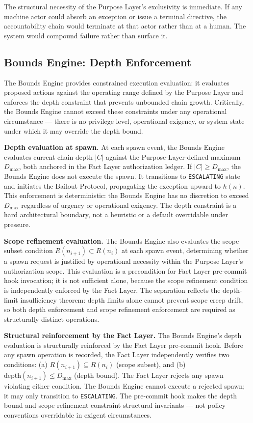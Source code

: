 \medskip
The structural necessity of the Purpose Layer's exclusivity is immediate. If any machine actor could absorb an exception or issue a terminal directive, the accountability chain would terminate at that actor rather than at a human. The system would compound failure rather than surface it.

\subsection{Bounds Engine: Depth Enforcement}
\label{sec:rs-bounds-depth}

The Bounds Engine provides constrained execution evaluation: it evaluates proposed actions against the operating range defined by the Purpose Layer and enforces the depth constraint that prevents unbounded chain growth. Critically, the Bounds Engine cannot exceed these constraints under any operational circumstance — there is no privilege level, operational exigency, or system state under which it may override the depth bound.

\medskip
\noindent\textbf{Depth evaluation at spawn.} At each spawn event, the Bounds Engine evaluates current chain depth $|C|$ against the Purpose-Layer-defined maximum $D_{\mathrm{max}}$, both anchored in the Fact Layer authorization ledger. If $|C| \geq D_{\mathrm{max}}$, the Bounds Engine does not execute the spawn. It transitions to \texttt{ESCALATING} state and initiates the Bailout Protocol, propagating the exception upward to $h(n)$. This enforcement is deterministic: the Bounds Engine has no discretion to exceed $D_{\mathrm{max}}$ regardless of urgency or operational exigency. The depth constraint is a hard architectural boundary, not a heuristic or a default overridable under pressure.

\medskip
\noindent\textbf{Scope refinement evaluation.} The Bounds Engine also evaluates the scope subset condition $R(n_{i+1}) \subset R(n_i)$ at each spawn event, determining whether a spawn request is justified by operational necessity within the Purpose Layer's authorization scope. This evaluation is a precondition for Fact Layer pre-commit hook invocation; it is not sufficient alone, because the scope refinement condition is independently enforced by the Fact Layer. The separation reflects the depth-limit insufficiency theorem: depth limits alone cannot prevent scope creep drift, so both depth enforcement and scope refinement enforcement are required as structurally distinct operations.

\medskip
\noindent\textbf{Structural reinforcement by the Fact Layer.} The Bounds Engine's depth evaluation is structurally reinforced by the Fact Layer pre-commit hook. Before any spawn operation is recorded, the Fact Layer independently verifies two conditions: (a) $R(n_{i+1}) \subseteq R(n_i)$ (scope subset), and (b) $\mathrm{depth}(n_{i+1}) \leq D_{\mathrm{max}}$ (depth bound). The Fact Layer rejects any spawn violating either condition. The Bounds Engine cannot execute a rejected spawn; it may only transition to \texttt{ESCALATING}. The pre-commit hook makes the depth bound and scope refinement constraint structural invariants — not policy conventions overridable in exigent circumstances.

